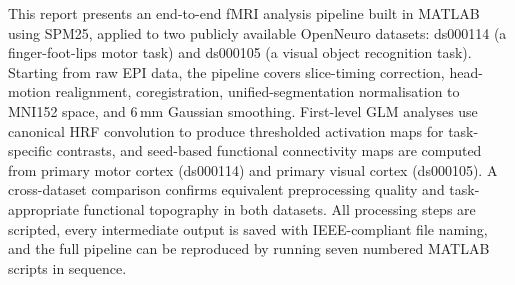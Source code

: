 This report presents an end-to-end fMRI analysis pipeline built in
MATLAB using SPM25, applied to two publicly available OpenNeuro
datasets: ds000114 (a finger-foot-lips motor task) and ds000105 (a
visual object recognition task). Starting from raw EPI data, the
pipeline covers slice-timing correction, head-motion realignment,
coregistration, unified-segmentation normalisation to MNI152 space,
and 6\,mm Gaussian smoothing. First-level GLM analyses use canonical
HRF convolution to produce thresholded activation maps for
task-specific contrasts, and seed-based functional connectivity maps
are computed from primary motor cortex (ds000114) and primary visual
cortex (ds000105). A cross-dataset comparison confirms equivalent
preprocessing quality and task-appropriate functional topography in
both datasets. All processing steps are scripted, every intermediate
output is saved with IEEE-compliant file naming, and the full pipeline
can be reproduced by running seven numbered MATLAB scripts in sequence.

